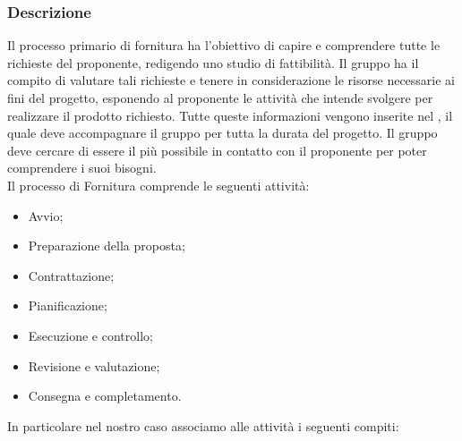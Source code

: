 \subsubsection{Descrizione} 
Il processo primario di fornitura ha l'obiettivo di capire e comprendere tutte le richieste del proponente, redigendo uno studio di fattibilità. 
Il gruppo \Gruppo{} ha il compito di valutare tali richieste e tenere in considerazione le risorse necessarie ai fini del progetto, esponendo al proponente \Proponente{} le attività che intende svolgere per realizzare il prodotto richiesto.
Tutte queste informazioni vengono inserite nel \PdP{}, il quale deve accompagnare il gruppo per tutta la durata del progetto.
Il gruppo \Gruppo{} deve cercare di essere il più possibile in contatto con il proponente per poter comprendere i suoi bisogni.\\
Il processo di Fornitura comprende le seguenti attività:
\begin{itemize}
	\item Avvio;
	\item Preparazione della proposta;
	\item Contrattazione;
	\item Pianificazione;
	\item Esecuzione e controllo;
	\item Revisione e valutazione;
	\item Consegna e completamento.
\end{itemize}
In particolare nel nostro caso associamo alle attività i seguenti compiti:

